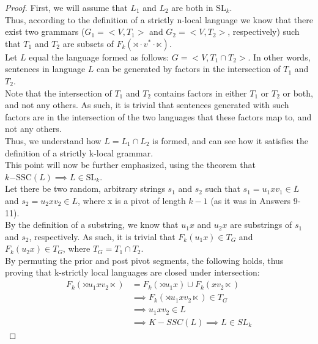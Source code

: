 \documentclass[10pt]{article}
\begin{document}
\begin{proof}
    First, we will assume that $L_1$ and $L_2$ are both in $\mathrm{SL}_k$.\\
    Thus, according to the definition of a strictly n-local language we know that there exist two grammars ($G_1=<V,T_1>$ and $G_2=<V,T_2>$, respectively) such that $T_{1}$ and $T_{2}$ are subsets of $F_k(\rtimes \cdot v^{*} \cdot \ltimes)$.\\
    Let $L$ equal the language formed as follows: $G=<V,T_1 \cap T_2>$. In other words, sentences in language $L$ can be generated by factors in the intersection of $T_1$ and $T_2$. \\
    Note that the intersection of $T_1$ and $T_2$ contains factors in either $T_1$ or $T_2$ or both, and not any others. As such, it is trivial that sentences generated with such factors are in the intersection of the two languages that these factors map to, and not any others.\\
    Thus, we understand how $L = L_1 \cap L_2$ is formed, and can see how it satisfies the definition of a strictly k-local grammar.\\
    This point will now be further emphasized, using the theorem that $k\mathrm{-SSC}(L) \implies L \in \mathrm{SL}_k$.\\
    Let there be two random, arbitrary strings $s_1$ and $s_2$ such that $s_1=u_1xv_1 \in L$ and $s_2=u_2xv_2 \in L$, where x is a pivot of length $k-1$ (as it was in Answers 9-11).\\
    By the definition of a substring, we know that $u_1x$ and $u_2x$ are substrings of $s_1$ and $s_2$, respectively. As such, it is trivial that $F_k(u_1x) \in T_G$ and $F_k(u_2x) \in T_G$, where $T_G=T_1 \cap T_2$.\\
    By permuting the prior and post pivot segments, the following holds, thus proving that k-strictly local languages are closed under intersection:\\
    \begin{equation*}
        \begin{split}
            F_k(\rtimes u_1xv_2 \ltimes) &= F_k(\rtimes u_1 x) \cup F_k(x v_2 \ltimes)\\
            &\implies F_k(\rtimes u_1xv_2 \ltimes) \in T_G\\
            &\implies u_1 x v_2 \in L\\
            &\implies K-SSC(L) \implies L \in SL_k
        \end{split}
    \end{equation*}
\end{proof}
\end{document}
